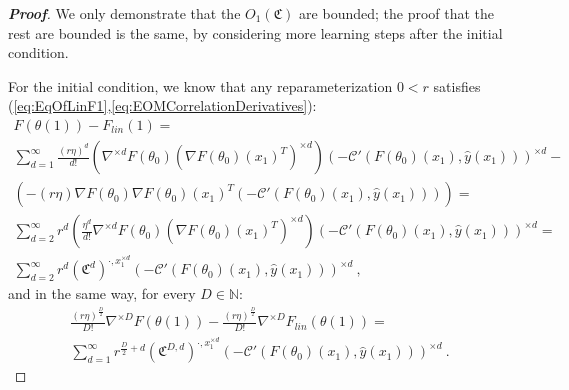 \documentclass{article} %
\begin{document}
\begin{proof}[\textbf{Proof}]
We only demonstrate that the \(O_{1}\left(\mathfrak{C}\right)\) are bounded; the proof that the rest are bounded is the same, by considering more learning steps after the initial condition.

For the initial condition, we know that any reparameterization \(0<r\) satisfies (\ref{eq:EqOfLinF1},\ref{eq:EOMCorrelationDerivatives}):
\begin{equation}
\begin{array}{c}
F\left(\theta\left(1\right)\right)-F_{lin}\left(1\right)=\\
\sum_{d=1}^{\infty}\frac{\left(r\eta\right)^{d}}{d!}\left(\nabla^{\times d}F\left(\theta_{0}\right)\left(\nabla F\left(\theta_{0}\right)\left(x_{1}\right)^{T}\right)^{\times d}\right)\left(-\mathcal{C}'\left(F\left(\theta_{0}\right)\left(x_{1}\right),\hat{y}\left(x_{1}\right)\right)\right)^{\times d}-\\
\left(-\left(r\eta\right)\nabla F\left(\theta_{0}\right)\nabla F\left(\theta_{0}\right)\left(x_{1}\right)^{T}\left(-\mathcal{C}'\left(F\left(\theta_{0}\right)\left(x_{1}\right),\hat{y}\left(x_{1}\right)\right)\right)\right)=\\
\sum_{d=2}^{\infty}r^{d}\left(\frac{\eta^{d}}{d!}\nabla^{\times d}F\left(\theta_{0}\right)\left(\nabla F\left(\theta_{0}\right)\left(x_{1}\right)^{T}\right)^{\times d}\right)\left(-\mathcal{C}'\left(F\left(\theta_{0}\right)\left(x_{1}\right),\hat{y}\left(x_{1}\right)\right)\right)^{\times d}=\\
\sum_{d=2}^{\infty}r^{d}\left(\mathfrak{C}^{d}\right)^{\cdot,x_{1}^{\times d}}\left(-\mathcal{C}'\left(F\left(\theta_{0}\right)\left(x_{1}\right),\hat{y}\left(x_{1}\right)\right)\right)^{\times d} \ ,
\end{array}
\label{Zap:eq:EOMDefCorr1}
\end{equation}
and in the same way, for every \(D\in\mathbb{N}\):
\begin{equation}
\begin{array}{c}
\frac{\left(r\eta\right)^{\frac{D}{2}}}{D!}\nabla^{\times D}F\left(\theta\left(1\right)\right)-\frac{\left(r\eta\right)^{\frac{D}{2}}}{D!}\nabla^{\times D}F_{lin}\left(\theta\left(1\right)\right)=\\
\sum_{d=1}^{\infty}r^{\frac{D}{2}+d}\left(\mathfrak{C}^{D,d}\right)^{\cdot,x_{1}^{\times d}}\left(-\mathcal{C}'\left(F\left(\theta_{0}\right)\left(x_{1}\right),\hat{y}\left(x_{1}\right)\right)\right)^{\times d} \ .
\end{array}
\label{Zap:eq:EOMDefCorr2}
\end{equation}


\end{proof}
\end{document}
